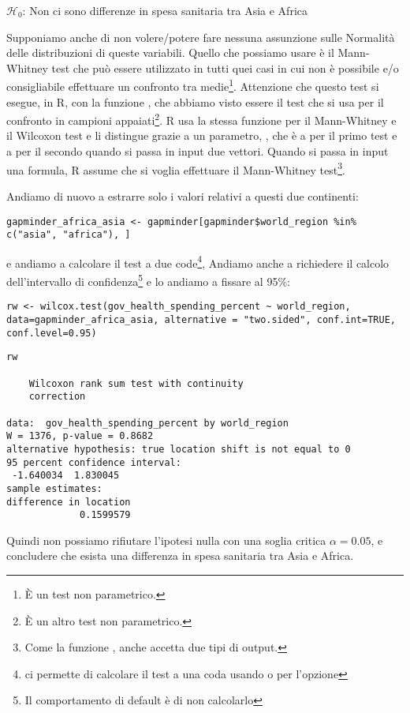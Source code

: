 \noindent $\mathcal{H}_0$: Non ci sono differenze in spesa sanitaria tra Asia e Africa

\vspace{0.2cm}

\noindent Supponiamo anche di non volere/potere fare nessuna assunzione sulle Normalit\`a delle distribuzioni di queste variabili. Quello che possiamo usare \`e il Mann-Whitney test che può essere utilizzato in tutti quei casi in cui non \`e possibile e/o consigliabile effettuare un confronto tra medie\footnote{\`E un test non parametrico.}. Attenzione che questo test si esegue, in R, con la funzione , che abbiamo visto essere il test che si usa per il confronto in campioni appaiati\footnote{\`E un altro test non parametrico.}. R usa la stessa funzione per il Mann-Whitney e il Wilcoxon test e li distingue grazie a un parametro, , che \`e a  per il primo test e a  per il secondo quando si passa in input due vettori. Quando si passa in input una formula, R assume che si voglia effettuare il Mann-Whitney test\footnote{Come la funzione , anche  accetta due tipi di output.}.

\noindent Andiamo di nuovo a estrarre solo i valori relativi a questi due continenti:

\begin{lstlisting}[style=Rstylescript]
gapminder_africa_asia <- gapminder[gapminder$world_region %in% c("asia", "africa"), ]
\end{lstlisting}
%
e andiamo a calcolare il test a due code\footnote{ ci permette di calcolare il test a una coda usando  o  per l'opzione }, Andiamo anche a richiedere il calcolo dell'intervallo di confidenza\footnote{Il comportamento di default \`e di non calcolarlo} e lo andiamo a fissare al 95\%:

\begin{lstlisting}[style=Rstylescript]
rw <- wilcox.test(gov_health_spending_percent ~ world_region, data=gapminder_africa_asia, alternative = "two.sided", conf.int=TRUE, conf.level=0.95)
\end{lstlisting}

\begin{lstlisting}[style=Rstyle]
rw 

	Wilcoxon rank sum test with continuity
	correction

data:  gov_health_spending_percent by world_region
W = 1376, p-value = 0.8682
alternative hypothesis: true location shift is not equal to 0
95 percent confidence interval:
 -1.640034  1.830045
sample estimates:
difference in location 
             0.1599579 
\end{lstlisting}
%
Quindi non possiamo rifiutare l'ipotesi nulla con una soglia critica $\alpha = 0.05$, e concludere che esista una differenza in spesa sanitaria tra Asia e Africa.



